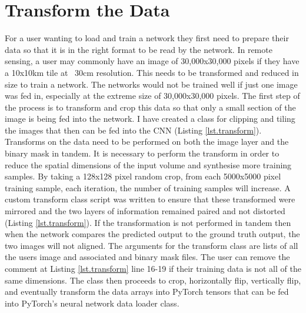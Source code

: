 \section{Transform the Data}\label{sec.transform}
For a user wanting to load and train a network they first need to prepare their data so that it is in the right format to be read by the network. In remote sensing, a user may commonly have an image of 30,000x30,000 pixels if they have a 10x10km tile at ~30cm resolution. This needs to be transformed and reduced in size to train a network. The networks would not be trained well if just one image was fed in, especially at the extreme size of 30,000x30,000 pixels. The first step of the process is to transform and crop this data so that only a small section of the image is being fed into the network. I have created a class for clipping and tiling the images that then can be fed into the CNN (Listing \ref{lst.transform}).
Transforms on the data need to be performed on both the image layer and the binary mask in tandem. It is necessary to perform the transform in order to reduce the spatial dimensions of the input volume and synthesise more training samples. By taking a 128x128 pixel random crop, from each 5000x5000 pixel training sample, each iteration, the number of training samples will increase. A custom transform class script was written to ensure that these transformed were mirrored and the two layers of information remained paired and not distorted (Listing \ref{lst.transform}). If the transformation is not performed in tandem then when the network compares the predicted output to the ground truth output, the two images will not aligned.
The arguments for the transform class are lists of all the users image and associated and binary mask files. The user can remove the comment at Listing \ref{lst.transform} line 16-19 if their training data is not all of the same dimensions. The class then proceeds to crop, horizontally flip, vertically flip, and eventually transform the data arrays into PyTorch tensors that can be fed into PyTorch's neural network data loader class. 
\par 
